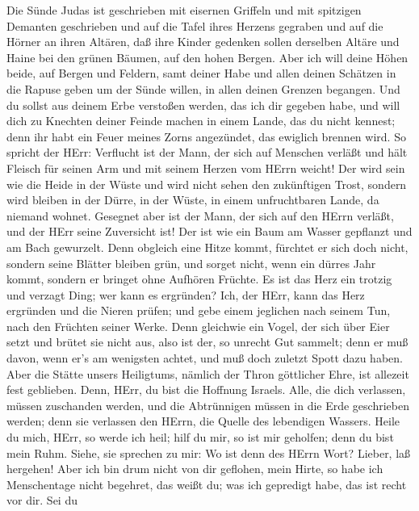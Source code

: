  Die Sünde Judas ist geschrieben mit eisernen Griffeln und
mit spitzigen Demanten geschrieben und auf die Tafel ihres Herzens
gegraben und auf die Hörner an ihren Altären,  daß ihre
Kinder gedenken sollen derselben Altäre und Haine bei den grünen Bäumen,
auf den hohen Bergen.  Aber ich will deine Höhen beide, auf
Bergen und Feldern, samt deiner Habe und allen deinen Schätzen in die
Rapuse geben um der Sünde willen, in allen deinen Grenzen begangen.
 Und du sollst aus deinem Erbe verstoßen werden, das ich dir
gegeben habe, und will dich zu Knechten deiner Feinde machen in einem
Lande, das du nicht kennest; denn ihr habt ein Feuer meines Zorns
angezündet, das ewiglich brennen wird.  So spricht der HErr:
Verflucht ist der Mann, der sich auf Menschen verläßt und hält Fleisch
für seinen Arm und mit seinem Herzen vom HErrn weicht!  Der
wird sein wie die Heide in der Wüste und wird nicht sehen den
zukünftigen Trost, sondern wird bleiben in der Dürre, in der Wüste, in
einem unfruchtbaren Lande, da niemand wohnet.  Gesegnet aber
ist der Mann, der sich auf den HErrn verläßt, und der HErr seine
Zuversicht ist!  Der ist wie ein Baum am Wasser gepflanzt
und am Bach gewurzelt. Denn obgleich eine Hitze kommt, fürchtet er sich
doch nicht, sondern seine Blätter bleiben grün, und sorget nicht, wenn
ein dürres Jahr kommt, sondern er bringet ohne Aufhören Früchte.
 Es ist das Herz ein trotzig und verzagt Ding; wer kann es
ergründen?  Ich, der HErr, kann das Herz ergründen und die
Nieren prüfen; und gebe einem jeglichen nach seinem Tun, nach den
Früchten seiner Werke.  Denn gleichwie ein Vogel, der sich
über Eier setzt und brütet sie nicht aus, also ist der, so unrecht Gut
sammelt; denn er muß davon, wenn er's am wenigsten achtet, und muß doch
zuletzt Spott dazu haben.  Aber die Stätte unsers
Heiligtums, nämlich der Thron göttlicher Ehre, ist allezeit fest
geblieben.  Denn, HErr, du bist die Hoffnung Israels. Alle,
die dich verlassen, müssen zuschanden werden, und die Abtrünnigen müssen
in die Erde geschrieben werden; denn sie verlassen den HErrn, die Quelle
des lebendigen Wassers.  Heile du mich, HErr, so werde ich
heil; hilf du mir, so ist mir geholfen; denn du bist mein Ruhm.
 Siehe, sie sprechen zu mir: Wo ist denn des HErrn Wort?
Lieber, laß hergehen!  Aber ich bin drum nicht von dir
geflohen, mein Hirte, so habe ich Menschentage nicht begehret, das weißt
du; was ich gepredigt habe, das ist recht vor dir.  Sei du
